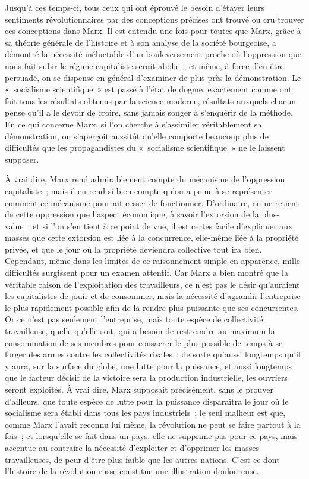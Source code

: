 \documentclass[french,twoside]{book} %
\begin{document}
\noindent \par
Jusqu'à ces temps-ci, tous ceux qui ont éprouvé le besoin d'étayer leurs sentiments révolutionnaires par des conceptions précises ont trouvé ou cru trouver ces conceptions dans Marx. Il est entendu une fois pour toutes que Marx, grâce à sa théorie générale de l'histoire et à son analyse de la société bourgeoise, a démontré la nécessité inéluctable d'un bouleversement proche où l'oppression que nous fait subir le régime capitaliste serait abolie ; et même, à force d'en être persuadé, on se dispense en général d'examiner de plus près la démonstration. Le « socialisme scientifique » est passé à l'état de dogme, exactement comme ont fait tous les résultats obtenus par la science moderne, résultats auxquels chacun pense qu'il a le devoir de croire, sans jamais songer à s'enquérir de la méthode. En ce qui concerne Marx, si l'on cherche à s'assimiler véritablement sa démonstration, on s'aperçoit aussitôt qu'elle comporte beaucoup plus de difficultés que les propagandistes du « socialisme scientifique » ne le laissent supposer.\par
À vrai dire, Marx rend admirablement compte du mécanisme de l'oppression capitaliste ; mais il en rend si bien compte qu'on a peine à se représenter comment ce mécanisme pourrait cesser de fonctionner. D'ordinaire, on ne retient de cette oppression que l'aspect économique, à savoir l'extorsion de la plus-value ; et si l'on s'en tient à ce point de vue, il est certes facile d'expliquer aux masses que cette extorsion est liée à la concurrence, elle-même liée à la propriété privée, et que le jour où la propriété deviendra collective tout ira bien. Cependant, même dans les limites de ce raisonnement simple en apparence, mille difficultés surgissent pour un examen attentif. Car Marx a bien montré que la véritable raison de l'exploitation des travailleurs, ce n'est pas le désir qu'auraient les capitalistes de jouir et de consommer, mais la nécessité d'agrandir l'entreprise le plus rapidement possible afin de la rendre plus puissante que ses concurrentes. Or ce n'est pas seulement l'entreprise, mais toute espèce de collectivité travailleuse, quelle qu'elle soit, qui a besoin de restreindre au maximum la consommation de ses membres pour consacrer le plus possible de temps à se forger des armes contre les collectivités rivales ; de sorte qu'aussi longtemps qu'il y aura, sur la surface du globe, une lutte pour la puissance, et aussi longtemps que le facteur décisif de la victoire sera la production industrielle, les ouvriers seront exploités. À vrai dire, Marx supposait précisément, sans le prouver d'ailleurs, que toute espèce de lutte pour la puissance disparaîtra le jour où le socialisme sera établi dans tous les pays industriels ; le seul malheur est que, comme Marx l'avait reconnu lui même, la révolution ne peut se faire partout à la fois ; et lorsqu'elle se fait dans un pays, elle ne supprime pas pour ce pays, mais accentue au contraire la nécessité d'exploiter et d'opprimer les masses travailleuses, de peur d'être plus faible que les autres nations. C'est ce dont l'histoire de la révolution russe constitue une illustration douloureuse.\par
\end{document}
